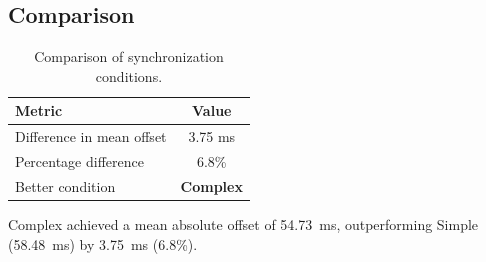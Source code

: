 \subsection*{Comparison}

\begin{table}[h!]
\centering
\begin{tabular}{|l|c|}
\hline
Metric & Value \\
\hline
Difference in mean offset & 3.75 ms \\
Percentage difference & 6.8\% \\
Better condition & \textbf{Complex} \\
\hline
\end{tabular}
\caption{Comparison of synchronization conditions.}
\label{tab:sync_comparison}
\end{table}

Complex achieved a mean absolute offset of 54.73~ms, outperforming Simple (58.48~ms) by 3.75~ms (6.8\%).
